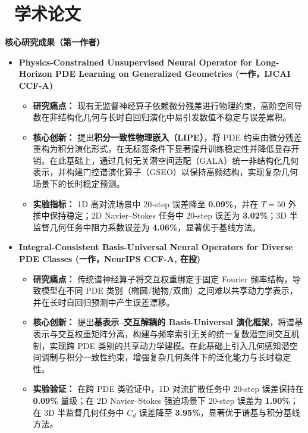 \documentclass[11pt]{article}
\begin{document}
\section{%
    \makebox[\widthof{\faTrophy}][c]%
    {\color{CVBlue}\faTrophy}\ 学术论文%
}
\textbf{核心研究成果（第一作者）}
\begin{itemize}
    \item \textbf {Physics-Constrained Unsupervised Neural Operator for Long-Horizon PDE Learning on Generalized Geometries (\textbf{一作}，IJCAI CCF-A)}
    \begin{itemize}[label=\tiny$\bullet$, leftmargin=1em]
        \item \textbf{研究痛点：} 现有无监督神经算子依赖微分残差进行物理约束，高阶空间导数在非结构化几何与长时自回归演化中易引发数值不稳定与误差累积。
        \item \textbf{核心创新：} 提出\textbf{积分一致性物理嵌入（LIPE）}，将 PDE 约束由微分残差重构为积分演化形式，在无标签条件下显著提升训练稳定性并降低显存开销。在此基础上，通过几何无关潜空间适配（GALA）统一非结构化几何表示，并构建门控谱演化算子（GSEO）以保持高频结构，实现复杂几何场景下的长时稳定预测。
        \item \textbf{实验指标：} 1D 高对流场景中 20-step 误差降至 \textbf{0.09\%}，并在 $T=50$ 外推中保持稳定；2D Navier–Stokes 任务中 20-step 误差为 \textbf{3.02\%}；3D 半监督几何任务中阻力系数误差为 \textbf{4.06\%}，显著优于基线方法。
    \end{itemize}
    \item \textbf {Integral-Consistent Basis-Universal Neural Operators for Diverse PDE Classes (\textbf{一作}，NeurIPS CCF-A, 在投)}
    \begin{itemize}[label=\tiny$\bullet$, leftmargin=1em]
        \item \textbf{研究痛点：} 传统谱神经算子将交互权重绑定于固定 Fourier 频率结构，导致模型在不同 PDE 类别（椭圆/抛物/双曲）之间难以共享动力学表示，并在长时自回归预测中产生误差漂移。
        \item \textbf{核心创新：} 提出\textbf{基表示–交互解耦的 Basis-Universal 演化框架}，将谱基表示与交互权重矩阵分离，构建与频率索引无关的统一复数潜空间交互机制，实现跨 PDE 类别的共享动力学建模。在此基础上引入几何感知潜空间调制与积分一致性约束，增强复杂几何条件下的泛化能力与长时稳定性。
        \item \textbf{实验验证：} 在跨 PDE 类验证中，1D 对流扩散任务中 20-step 误差保持在 \textbf{0.09\%} 量级；在 2D Navier–Stokes 强迫场景下 20-step 误差为 \textbf{1.90\%}；在 3D 半监督几何任务中 $C_d$ 误差降至 \textbf{3.95\%}，显著优于谱基与积分基线方法。
    \end{itemize}
\end{itemize}
\vspace{0.5em} %
\end{document}
